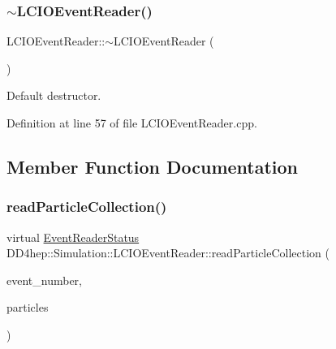 \subsubsection{\texorpdfstring{$\sim$\+L\+C\+I\+O\+Event\+Reader()}{~LCIOEventReader()}}
{\footnotesize\ttfamily L\+C\+I\+O\+Event\+Reader\+::$\sim$\+L\+C\+I\+O\+Event\+Reader (\begin{DoxyParamCaption}{ }\end{DoxyParamCaption})\hspace{0.3cm}{\ttfamily [virtual]}}



Default destructor. 



Definition at line 57 of file L\+C\+I\+O\+Event\+Reader.\+cpp.



\subsection{Member Function Documentation}
\hypertarget{class_d_d4hep_1_1_simulation_1_1_l_c_i_o_event_reader_a49acaafd98bbd6a954b29cfd9465d017}{}\label{class_d_d4hep_1_1_simulation_1_1_l_c_i_o_event_reader_a49acaafd98bbd6a954b29cfd9465d017} 
\subsubsection{\texorpdfstring{read\+Particle\+Collection()}{readParticleCollection()}}
{\footnotesize\ttfamily virtual \hyperlink{class_d_d4hep_1_1_simulation_1_1_geant4_event_reader_ae4f4bc83ffcf5b0c1868ad78859851e7}{Event\+Reader\+Status} D\+D4hep\+::\+Simulation\+::\+L\+C\+I\+O\+Event\+Reader\+::read\+Particle\+Collection (\begin{DoxyParamCaption}\item[{int}]{event\+\_\+number,  }\item[{E\+V\+E\+N\+T\+::\+L\+C\+Collection $\ast$$\ast$}]{particles }\end{DoxyParamCaption})\hspace{0.3cm}{\ttfamily [pure virtual]}}



